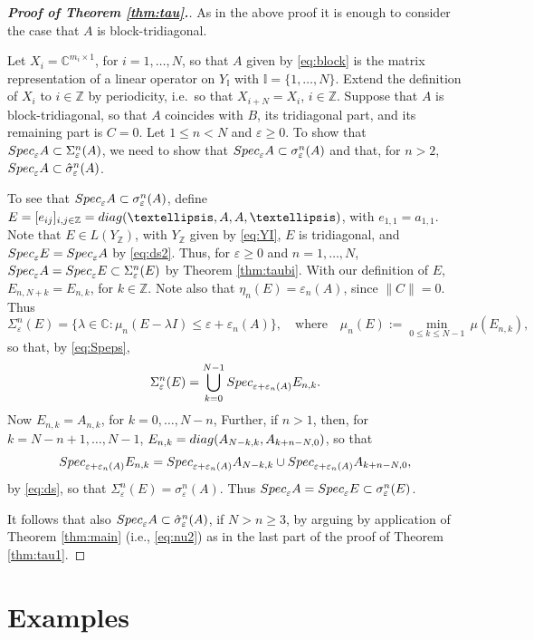 \documentclass[preprint,1p,11pt]{elsarticle}
\newcommand\C{{\mathbb C}}
\newcommand\I{{\mathbb I}}
\newcommand\Z{{\mathbb Z}}
\newcommand\eps{{\varepsilon}}
\newcommand\Specn{{\rm Spec}}   %
\newcommand\Speps{{\rm Spec}_\eps}
\newcommand\diag{{\rm diag}}
\numberwithin{equation}{section}   %
\numberwithin{figure}{section}  %
\begin{document}
\begin{proof}[{\bf Proof of Theorem  \ref{thm:tau}.}] As in the above proof it is enough to consider the case that $A$ is block-tridiagonal. 

Let $X_i = \C^{m_i\times 1}$, for $i=1,\ldots,N$, so that $A$ given by \eqref{eq:block} is the matrix representation of a linear operator on $Y_\I$ with $\I=\{1,\ldots,N\}$. Extend the definition of $X_i$ to $i\in \Z$ by periodicity, i.e.\ so that $X_{i+N}=X_i$, $i\in \Z$. Suppose that $A$ is block-tridiagonal, so that $A$ coincides with $B$, its tridiagonal part, and its remaining part is $C=0$. Let $1\leq n< N$ and $\eps\geq 0$. To show that $\Speps A \subset \Sigma^n_\eps(A)$, we need to show that $\Speps A \subset \sigma^n_\eps(A)$ and that, for $n>2$, $\Speps A \subset \hat \sigma^n_\eps(A)$.

To see that $\Speps A \subset \sigma^n_\eps(A)$, define $E=[e_{ij}]_{i,j\in \Z}=\diag(\ldots,A,A,\ldots)$, with $e_{1,1}=a_{1,1}$. Note that $E\in L(Y_\Z)$, with $Y_\Z$ given by \eqref{eq:YI}, $E$ is tridiagonal, and $\Speps E = \Speps A$ by \eqref{eq:ds2}. Thus, for $\eps\geq 0$ and $n=1,\ldots,N$, $\Speps A = \Speps E \subset \Sigma^n_\eps(E)$ by Theorem \ref{thm:taubi}. With our definition of $E$, $E_{n,N+k}=E_{n,k}$, for $k\in \Z$. Note also that  $\eta_n(E)=\eps_n(A)$, since $\|C\|=0$. Thus 
$$
\Sigma^n_\eps(E) = \{\lambda\in \C:\mu_n(E-\lambda I)\leq \eps+\eps_n(A)\}, \quad \mbox{where} \quad \mu_n(E)  := \min_{0\leq k\leq N-1} \, \mu(E_{n,k}),
$$
so that, by \eqref{eq:Speps},
$$
\Sigma^n_\eps(E) = \bigcup_{k=0}^{N-1} \Specn_{\eps+\eps_n(A)} E_{n,k}.
$$
Now $E_{n,k}=A_{n,k}$, for $k=0,\ldots,N-n$, Further, if $n>1$, then, for $k=N-n+1,\ldots,N-1$, $E_{n,k} = \diag(A_{N-k,k},A_{k+n-N,0})$, so that
$$
\Specn_{\eps+\eps_n(A)} E_{n,k} = \Specn_{\eps+\eps_n(A)} A_{N-k,k} \cup  \Specn_{\eps+\eps_n(A)}A_{k+n-N,0},
$$
by \eqref{eq:ds}, so that $\Sigma^n_\eps(E) = \sigma^n_{\eps}(A)$. Thus $\Speps A = \Speps E \subset \sigma^n_\eps(E)$.

It follows that also  $\Speps A \subset \hat \sigma^n_\eps(A)$, if $N> n\geq 3$, by arguing by application of Theorem \ref{thm:main} (i.e., \eqref{eq:nu2})  as in the last part of the proof of Theorem \ref{thm:tau1}.
\end{proof}



\section{Examples} \label{sec:examples}
\end{document}

